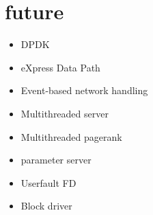 \section{future}
\begin{itemize}
    \item DPDK
    \item eXpress Data Path
    \item Event-based network handling
    \item Multithreaded server
    \item Multithreaded pagerank
    \item parameter server
    \item Userfault FD
    \item Block driver
\end{itemize}
\label{sec:future}
